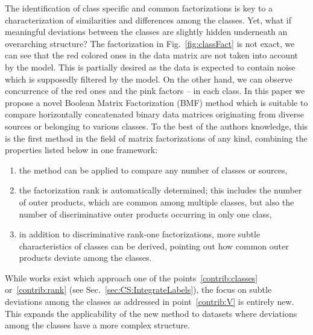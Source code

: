 The identification of class specific and common factorizations is key to a characterization of similarities and differences among the classes. Yet, what if meaningful deviations between the classes are slightly hidden underneath an overarching structure? The factorization in Fig.~\ref{fig:classFact} is not exact, we can see that the red colored ones in the data matrix are not taken into account by the model. This is partially desired as the data is expected to contain noise which is supposedly filtered by the model. On the other hand, we can observe concurrence of the red ones and the pink factors -- in each class.
In this paper we propose a novel Boolean Matrix Factorization (BMF) method which is suitable to compare horizontally concatenated binary data matrices originating from diverse sources or belonging to various classes. To the best of the authors knowledge, this is the first method in the field of matrix factorizations of any kind, combining the properties listed below in one framework:
\begin{enumerate}
\item \label{contrib:classes}the method can be applied to compare any number of classes or sources,
\item \label{contrib:rank}the factorization rank is automatically determined; this includes the number of outer products, which are common among multiple classes, but also the number of discriminative outer products occurring in only one class,
\item \label{contrib:V}in addition to discriminative rank-one factorizations, more subtle characteristics of classes can be derived, pointing out how common outer products deviate among the classes.
\end{enumerate}
While works exist which approach one of the points~\ref{contrib:classes} or~\ref{contrib:rank} (see Sec.~\ref{sec:CS:IntegrateLabels}), the focus on subtle deviations among the classes as addressed in point~\ref{contrib:V} is entirely new. This expands the applicability of the new method to datasets where deviations among the classes have a more complex structure.
